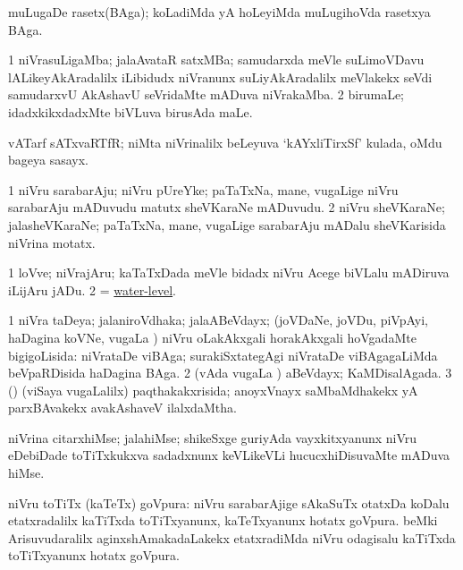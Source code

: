 \bentry
{} 
\gl{\nA}
\expl{}
\bmng
muLugaDe rasetx(BAga); koLadiMda yA hoLeyiMda muLugihoVda rasetxya BAga. 
\emng
\eentry

\bentry
{} 
\gl{\nA}
\expl{}
\bmng
\bnum
\num{1} niVrasuLigaMba; jalaAvataR satxMBa; samudarxda meVle suLimoVDavu lALikeyAkAradalilx iLibidudx niVranunx suLiyAkAradalilx meVlakekx seVdi samudarxvU AkAshavU seVridaMte mADuva niVrakaMba. 
\num{2} birumaLe; idadxkikxdadxMte biVLuva birusAda maLe. 
\enum
\emng
\eentry

\bentry
{} 
\gl{\nA}
\expl{}
\bmng
vATarf sATxvaRTfR; niMta niVrinalilx beLeyuva `kAYxliTirxSf' kulada, oMdu bageya sasayx. 
\emng
\eentry

\bentry
{} 
\gl{\nA}
\expl{}
\bmng
\bnum
\num{1} niVru sarabarAju; niVru pUreYke; paTaTxNa, mane, \mo vugaLige niVru sarabarAju mADuvudu matutx sheVKaraNe mADuvudu. 
\num{2} niVru sheVKaraNe; jalasheVKaraNe; paTaTxNa, mane, \mo vugaLige sarabarAju mADalu sheVKarisida niVrina motatx. 
\enum
\emng
\eentry

\bentry
{} 
\gl{\nA}
\expl{}
\bmng
\bnum
\num{1} loVve; niVrajAru; kaTaTxDada meVle bidadx niVru Acege biVLalu mADiruva iLijAru jADu. 
\num{2} = \hyperlink{water-level}{water-level}. 
\enum
\emng
\eentry

\bentry
{} 
\gl{\gu}
\expl{}
\bmng
\bnum
\num{1} niVra taDeya; jalaniroVdhaka; jalaABeVdayx; (joVDaNe, joVDu, piVpAyi, haDagina koVNe, \mo vugaLa \vi) niVru oLakAkxgali horakAkxgali hoVgadaMte bigigoLisida:  niVrataDe viBAga; surakiSxtategAgi niVrataDe viBAgagaLiMda beVpaRDisida haDagina BAga. 
\num{2} (vAda \mo vugaLa \vi) aBeVdayx; KaMDisalAgada. 
\num{3} (\rUpa) (viSaya \mo vugaLalilx) paqthakakxrisida; anoyxVnayx saMbaMdhakekx yA parxBAvakekx avakAshaveV ilalxdaMtha. 
\enum
\emng
\eentry

\bentry
{} 
\gl{\nA}
\expl{}
\bmng
niVrina citarxhiMse; jalahiMse; shikeSxge guriyAda vayxkitxyanunx niVru eDebiDade toTiTxkukxva sadadxnunx keVLikeVLi hucucxhiDisuvaMte mADuva hiMse. 
\emng
\eentry

\bentry
{} 
\gl{\nA}
\expl{}
\bmng
niVru toTiTx (kaTeTx) goVpura: 
\banum
{} niVru sarabarAjige sAkaSuTx otatxDa koDalu etatxradalilx kaTiTxda toTiTxyanunx, kaTeTxyanunx hotatx goVpura. 
 beMki Arisuvudaralilx aginxshAmakadaLakekx etatxradiMda niVru odagisalu kaTiTxda toTiTxyanunx hotatx goVpura. 
\eanum
\emng
\eentry

